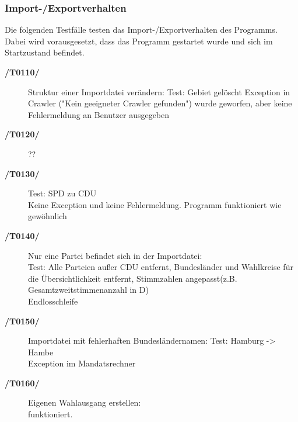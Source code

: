 \documentclass[12pt,a4paper,titlepage]{article}
\begin{document}
\subsubsection{Import-/Exportverhalten}
Die folgenden Testfälle testen das Import-/Exportverhalten des Programms. Dabei wird vorausgesetzt, dass das Programm gestartet wurde und sich im Startzustand befindet. 
\begin{description}
	\item[\textbf{/T0110/}] Struktur einer Importdatei verändern: \newline
	Test: Gebiet gelöscht \newline
	Exception in Crawler ("Kein geeigneter Crawler gefunden") wurde geworfen, aber keine Fehlermeldung an Benutzer ausgegeben
	\item[\textbf{/T0120/}] 
	?? 
	\item[\textbf{/T0130/}] 
	Test: SPD zu CDU \\
	Keine Exception und keine Fehlermeldung. Programm funktioniert wie gewöhnlich
	\item[\textbf{/T0140/}] Nur eine Partei befindet sich in der Importdatei:\\
	Test: Alle Parteien außer CDU entfernt, Bundesländer und Wahlkreise für die Übersichtlichkeit entfernt, Stimmzahlen angepasst(z.B. Gesamtzweitstimmenanzahl in D) \\
	Endlosschleife 
	 \newline

	\item[\textbf{/T0150/}] Importdatei mit fehlerhaften Bundesländernamen:
	Test: Hamburg -> Hambe\\
	Exception im Mandatsrechner
	\item[\textbf{/T0160/}] Eigenen Wahlausgang erstellen: \\
	funktioniert.
\end{description}
\end{document}
